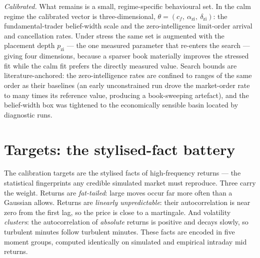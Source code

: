 \emph{Calibrated.} What remains is a small, regime-specific behavioural set. In
the calm regime the calibrated vector is three-dimensional,
$\theta = (c_f,\ \alpha_{\mathrm{zi}},\ \delta_{\mathrm{zi}})$: the
fundamental-trader belief-width scale and the zero-intelligence limit-order
arrival and cancellation rates. Under stress the same set is augmented with the
placement depth $p_{\mathrm{zi}}$ --- the one measured parameter that re-enters
the search --- giving four dimensions, because a sparser book materially improves
the stressed fit while the calm fit prefers the directly measured value. Search
bounds are literature-anchored: the zero-intelligence rates are confined to
ranges of the same order as their \citet{cont_stoikov_talreja_2008} baselines
(an early unconstrained run drove the market-order rate to many times its
reference value, producing a book-sweeping artefact), and the belief-width box
was tightened to the economically sensible basin located by diagnostic runs.



\section{Targets: the stylised-fact battery}
\label{sec:cal-targets}

The calibration targets are the stylised facts of high-frequency returns
\citep{cont_2001} --- the statistical fingerprints any credible simulated market
must reproduce. Three carry the weight. Returns are \emph{fat-tailed}: large
moves occur far more often than a Gaussian allows. Returns are \emph{linearly
unpredictable}: their autocorrelation is near zero from the first lag, so the
price is close to a martingale. And volatility \emph{clusters}: the
autocorrelation of \emph{absolute} returns is positive and decays slowly, so
turbulent minutes follow turbulent minutes. These facts are encoded in five
moment groups, computed identically on simulated and empirical intraday mid
returns.

